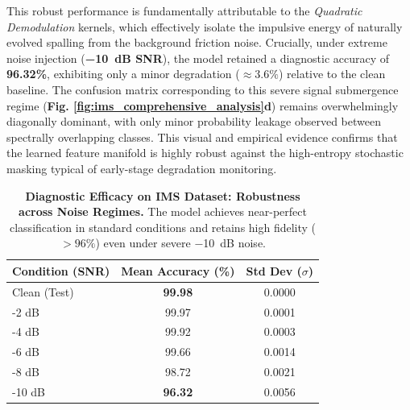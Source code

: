 \documentclass[5p,times,twocolumn]{elsarticle}
\begin{document}
This robust performance is fundamentally attributable to the \textit{Quadratic Demodulation} kernels, which effectively isolate the impulsive energy of naturally evolved spalling from the background friction noise. Crucially, under extreme noise injection (\textbf{\SI{-10}{dB} SNR}), the model retained a diagnostic accuracy of \textbf{96.32\%}, exhibiting only a minor degradation ($\approx 3.6\%$) relative to the clean baseline. The confusion matrix corresponding to this severe signal submergence regime (\textbf{Fig. \ref{fig:ims_comprehensive_analysis}d}) remains overwhelmingly diagonally dominant, with only minor probability leakage observed between spectrally overlapping classes. This visual and empirical evidence confirms that the learned feature manifold is highly robust against the high-entropy stochastic masking typical of early-stage degradation monitoring.

\begin{table}[htbp]
\centering
\caption{\textbf{Diagnostic Efficacy on IMS Dataset: Robustness across Noise Regimes.} The model achieves near-perfect classification in standard conditions and retains high fidelity ($>96\%$) even under severe \SI{-10}{dB} noise.}
\label{tab:ims_results}
\setlength{\tabcolsep}{10pt}
\begin{tabular}{l c c}
\toprule
\textbf{Condition (SNR)} & \textbf{Mean Accuracy (\%)} & \textbf{Std Dev ($\sigma$)} \\ \midrule
Clean (Test) & \textbf{99.98} & 0.0000 \\
-2 dB        & 99.97          & 0.0001 \\
-4 dB        & 99.92          & 0.0003 \\
-6 dB        & 99.66          & 0.0014 \\
-8 dB        & 98.72          & 0.0021 \\
-10 dB       & \textbf{96.32} & 0.0056 \\ \bottomrule
\end{tabular}
\end{table}
\end{document}
